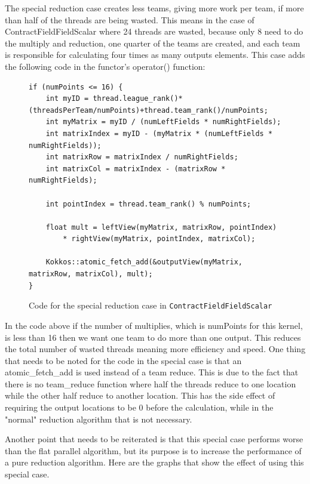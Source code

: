 The special reduction case creates less teams, giving more work per team, if more than half of the threads are being wasted. This means in the case of ContractFieldFieldScalar where 24 threads are wasted, because only 8 need to do the multiply and reduction, one quarter of the teams are created, and each team is responsible for calculating four times as many outputs elements. This case adds the following code in the functor's operator() function: \\
\begin{figure}[!ht]
    \begin{lstlisting}
if (numPoints <= 16) {	
	int myID = thread.league_rank()*(threadsPerTeam/numPoints)+thread.team_rank()/numPoints;
	int myMatrix = myID / (numLeftFields * numRightFields);
	int matrixIndex = myID - (myMatrix * (numLeftFields * numRightFields));
	int matrixRow = matrixIndex / numRightFields;
	int matrixCol = matrixIndex - (matrixRow * numRightFields);

	int pointIndex = thread.team_rank() % numPoints;

	float mult = leftView(myMatrix, matrixRow, pointIndex) 
		* rightView(myMatrix, pointIndex, matrixCol);

	Kokkos::atomic_fetch_add(&outputView(myMatrix, matrixRow, matrixCol), mult);
}
    \end{lstlisting}
\caption{Code for the special reduction case in \texttt{ContractFieldFieldScalar}
\label{lst:ContractFieldFieldScalarReductionSpecialCase}} 
\end{figure}

In the code above if the number of multiplies, which is numPoints for this kernel, is less than 16 then we want one team to do more than one output. This reduces the total number of wasted threads meaning more efficiency and speed. One thing that needs to be noted for the code in the special case is that an atomic\_fetch\_add is used instead of a team reduce. This is due to the fact that there is no team\_reduce function where half the threads reduce to one location while the other half reduce to another location. This has the side effect of requiring the output locations to be 0 before the calculation, while in the "normal" reduction algorithm that is not necessary. 

Another point that needs to be reiterated is that this special case performs worse than the flat parallel algorithm, but its purpose is to increase the performance of a pure reduction algorithm. Here are the graphs that show the effect of using this special case. 

